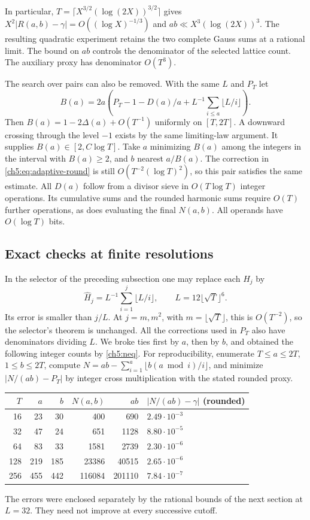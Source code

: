 \documentclass[11pt,a4paper,oneside,openany]{report}
\theoremstyle{remark}\newtheorem{remark}[theorem]{Remark}
\numberwithin{equation}{section}
\begin{document}
In particular, $T=\lceil X^{3/2}(\log(2X))^{3/2}\rceil$ gives $X^2|R(a,b)-\gamma|=O((\log X)^{-1/3})$ and $ab\ll X^3(\log(2X))^3$. The resulting quadratic experiment retains the two complete Gauss sums at a rational limit. The bound on $ab$ controls the denominator of the selected lattice count. The auxiliary proxy has denominator $O(T^3)$.

The search over pairs can also be removed. With the same $L$ and $P_T$ let
\[
 B(a)=2a\left(P_T-1-D(a)/a+L^{-1}\sum_{i\le a}\lfloor L/i\rfloor\right).
\]
Then $B(a)=1-2\Delta(a)+O(T^{-1})$ uniformly on $[T,2T]$. A downward crossing through the level $-1$ exists by the same limiting-law argument. It supplies $B(a)\in[2,C\log T]$. Take $a$ minimizing $B(a)$ among the integers in the interval with $B(a)\ge2$, and $b$ nearest $a/B(a)$. The correction in \eqref{ch5:eq:adaptive-round} is still $O(T^{-2}(\log T)^2)$, so this pair satisfies the same estimate. All $D(a)$ follow from a divisor sieve in $O(T\log T)$ integer operations. Its cumulative sums and the rounded harmonic sums require $O(T)$ further operations, as does evaluating the final $N(a,b)$. All operands have $O(\log T)$ bits.
\subsection{Exact checks at finite resolutions}
In the selector of the preceding subsection one may replace each $H_j$ by
\[
 \widehat H_j=L^{-1}\sum_{i=1}^j\lfloor L/i\rfloor,\qquad
 L=12\lfloor\sqrt T\rfloor^6 .
\]
Its error is smaller than $j/L$. At $j=m,m^2$, with $m=\lfloor\sqrt T\rfloor$, this is $O(T^{-2})$, so the selector's theorem is unchanged. All the corrections used in $P_T$ also have denominators dividing $L$. We broke ties first by $a$, then by $b$, and obtained the following integer counts by \eqref{ch5:neq}. For reproducibility, enumerate $T\le a\le2T$, $1\le b\le2T$, compute $N=ab-\sum_{i=1}^a\lfloor b(a\bmod i)/i\rfloor$, and minimize $|N/(ab)-P_T|$ by integer cross multiplication with the stated rounded proxy.
\begin{center}
\begin{tabular}{rrrrrl}\toprule
$T$&$a$&$b$&$N(a,b)$&$ab$& $|N/(ab)-\gamma|$ (rounded)\\\midrule
16&23&30&400&690&$2.49\cdot10^{-3}$\\
32&47&24&651&1128&$8.80\cdot10^{-5}$\\
64&83&33&1581&2739&$2.30\cdot10^{-6}$\\
128&219&185&23386&40515&$2.65\cdot10^{-6}$\\
256&455&442&116084&201110&$7.84\cdot10^{-7}$\\\bottomrule
\end{tabular}
\end{center}
The errors were enclosed separately by the rational bounds of the next section at $L=32$. They need not improve at every successive cutoff.
\end{document}
